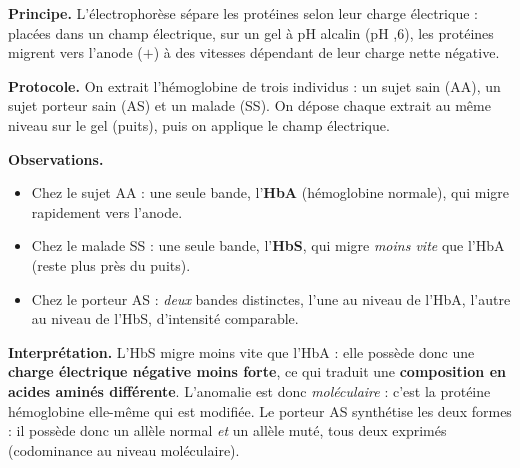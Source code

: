 \documentclass[11pt]{article}
\newcommand{\cle}[1]{{\popxbold\color{popdark}#1}}
\begin{document}
\begin{experience}
\textbf{Principe.} L'\cle{électrophorèse} sépare les protéines selon leur charge électrique : placées dans un champ électrique, sur un gel à pH alcalin (pH ,6), les protéines migrent vers l'anode ($+$) à des vitesses dépendant de leur charge nette négative.

\textbf{Protocole.} On extrait l'hémoglobine de trois individus : un sujet sain (AA), un sujet porteur sain (AS) et un malade (SS). On dépose chaque extrait au même niveau sur le gel (puits), puis on applique le champ électrique.

\textbf{Observations.}
\begin{itemize}
\item Chez le sujet AA : une seule bande, l'\textbf{HbA} (hémoglobine normale), qui migre rapidement vers l'anode.
\item Chez le malade SS : une seule bande, l'\textbf{HbS}, qui migre \emph{moins vite} que l'HbA (reste plus près du puits).
\item Chez le porteur AS : \emph{deux} bandes distinctes, l'une au niveau de l'HbA, l'autre au niveau de l'HbS, d'intensité comparable.
\end{itemize}

\textbf{Interprétation.} L'HbS migre moins vite que l'HbA : elle possède donc une \textbf{charge électrique négative moins forte}, ce qui traduit une \textbf{composition en acides aminés différente}. L'anomalie est donc \emph{moléculaire} : c'est la protéine hémoglobine elle-même qui est modifiée. Le porteur AS synthétise les deux formes : il possède donc un allèle normal \emph{et} un allèle muté, tous deux exprimés (codominance au niveau moléculaire).
\end{experience}
\end{document}
